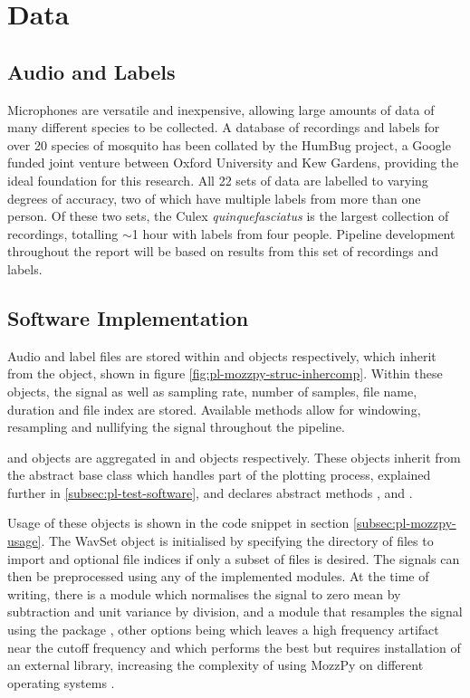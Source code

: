 \section{Data}
\label{sec:pl-data}

    \subsection{Audio and Labels}
    \label{subsec:pl-data-audiolbls}
        Microphones are versatile and inexpensive, allowing large amounts of data of many different species to be collected. A database of recordings and labels for over 20 species of mosquito has been collated by the HumBug project, a Google funded joint venture between Oxford University and Kew Gardens, providing the ideal foundation for this research. All 22 sets of data are labelled to varying degrees of accuracy, two of which have multiple labels from more than one person. Of these two sets, the Culex \textit{quinquefasciatus} is the largest collection of recordings, totalling $\sim$1 hour with labels from four people. Pipeline development throughout the report will be based on results from this set of recordings and labels.
        
    \subsection{Software Implementation}
    \label{subsec:pl-data-software}
        Audio and label files are stored within  and  objects respectively, which inherit from the  object, shown in figure \ref{fig:pl-mozzpy-struc-inhercomp}. Within these objects, the signal as well as sampling rate, number of samples, file name, duration and file index are stored. Available methods allow for windowing, resampling and nullifying the signal throughout the pipeline. 
        
         and  objects are aggregated in  and  objects respectively. These objects inherit from the abstract base class  which handles part of the plotting process, explained further in \ref{subsec:pl-test-software}, and declares abstract methods ,  and .
        
        Usage of these objects is shown in the code snippet in section \ref{subsec:pl-mozzpy-usage}. The WavSet object is initialised by specifying the directory of  files to import and optional file indices if only a subset of files is desired. The signals can then be preprocessed using any of the implemented modules. At the time of writing, there is a  module which normalises the signal to zero mean by subtraction and unit variance by division, and a  module that resamples the signal using the  package \cite{BrianMcFee}, other options being  \cite{ScipyCommunity} which leaves a high frequency artifact near the cutoff frequency and  \cite{DavidCournapeau} which performs the best but requires installation of an external library, increasing the complexity of using MozzPy on different operating systems \cite{Thiemann}. 
        

